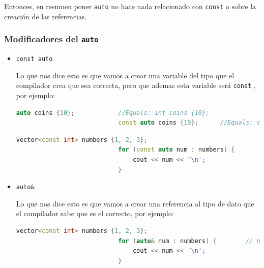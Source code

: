 \documentclass[12pt, fleqn]{report}                             %
\theoremstyle{break}                                            %
\newcommand{\textCode}[1]  { \texttt{#1} }                      %
\begin{document}
                Entonces, en resumen poner \textCode{auto} no hace nada relacionado con \textCode{const} o 
                sobre la creación de las referencias.

                \subsubsection{Modificadores del \textCode{auto}} 

                \begin{itemize}
                    \item \textCode{const auto}

                        Lo que nos dice esto es que vamos a crear una variable del tipo que el compilador crea
                        que sea correcta, pero que ademas esta variable será \textCode{const}, por ejemplo:
                        \begin{lstlisting}[language=C++, gobble=28]
                            auto coins {10};            //Equals: int coins {10};
                            const auto coins {10};      //Equals: const int coins {10};
                        \end{lstlisting}

                        \begin{lstlisting}[language=C++, gobble=28]
                            vector<const int> numbers {1, 2, 3};
                            for (const auto num : numbers) {        // num is const int
                                cout << num << '\n';
                            }
                        \end{lstlisting}

                    \item \textCode{auto\&}
                    
                        Lo que nos dice esto es que vamos a crear una referencia al tipo de dato
                        que el compilador sabe que es el correcto, por ejemplo:
                        \begin{lstlisting}[language=C++, gobble=28]
                            vector<const int> numbers {1, 2, 3};
                            for (auto& num : numbers) {        // num is int&
                                cout << num << '\n';
                            }
                        \end{lstlisting}


\end{itemize}
\end{document}
